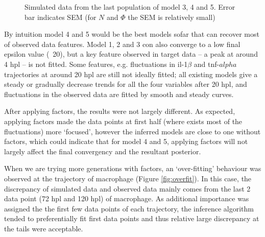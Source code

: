 \begin{figure}
    \begin{center}
    \end{center}

    \caption{Simulated data from the last population of model 3, 4 and 5. Error bar indicates SEM (for $N$ and $\Phi$ the SEM is relatively small)}
    \label{fig:resultCurve345}

\end{figure}

By intuition model 4 and 5 would be the best models sofar that can recover most of observed data features. Model 1, 2 and 3 con also converge to a low final epsilon value (~20), but a key feature observed in target data -- a peak at around 4 hpl -- is not fitted. Some features, e.g. fluctuations in il-1$\beta$ and tnf-$alpha$ trajectories at around 20 hpl are still not ideally fitted; all existing models give a steady or gradually decrease trends for all the four variables after 20 hpl, and fluctuations in the observed data are fitted by smooth and steady curves.

After applying factors, the results were not largely different. As expected, applying factors made the data points at first half (where exists most of the fluctuations) more `focused', however the inferred models are close to one without factors, which could indicate that for model 4 and 5, applying factors will not largely affect the final convergency and the resultant posterior.

When we are trying more generations with factors, an `over-fitting' behaviour was observed at the trajectory of macrophage (Figure \ref{fig:overfit}). In this case, the discrepancy of simulated data and observed data mainly comes from the last 2 data point (72 hpl and 120 hpl) of macrophage. As additional importance was assigned the the first few data points of each trajectory, the inference algorithm tended to preferentially fit first data points and thus relative large discrepancy at the tails were acceptable.

